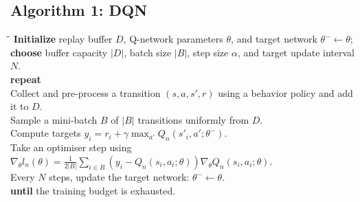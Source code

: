 \documentclass[11pt,a4paper]{article}
\newcommand{\nexttopic}{\clearpage}
\begin{document}
\subsection{Algorithm 1: DQN}

{\small
\begin{tabbing}
\hspace{1.3em}\=\hspace{1.3em}\=\kill
\textbf{Initialize} replay buffer $D$, Q-network parameters $\theta$, and target network $\theta^-\leftarrow\theta$;\\
\> \textbf{choose} buffer capacity $|D|$, batch size $|B|$, step size $\alpha$, and target update interval $N$.\\
\textbf{repeat}\\
\> Collect and pre-process a transition $(s,a,s',r)$ using a behavior policy and add it to $D$.\\
\> Sample a mini-batch $B$ of $|B|$ transitions uniformly from $D$.\\
\> Compute targets $y_i=r_i+\gamma\max_{a'}Q_n(s'_i,a';\theta^-)$.\\
\> Take an optimiser step using $\nabla_\theta l_n(\theta)=\frac{1}{2|B|}\sum_{i\in B}(y_i-Q_n(s_i,a_i;\theta))\nabla_\theta Q_n(s_i,a_i;\theta)$.\\
\> Every $N$ steps, update the target network: $\theta^-\leftarrow\theta$.\\
\textbf{until} the training budget is exhausted.
\end{tabbing}}

\nexttopic
\end{document}
